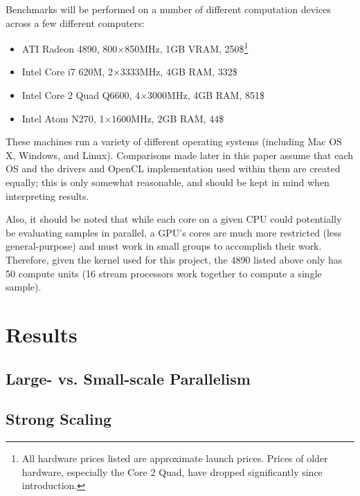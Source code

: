 \documentclass{acmsiggraph}
\begin{document}
Benchmarks will be performed on a number of different computation devices across a few different computers:

\begin{itemize}

\item ATI Radeon 4890, 800$\times$850MHz, 1GB VRAM, 250\$\footnote{All hardware prices listed are approximate launch prices. Prices of older hardware, especially the Core 2 Quad, have dropped significantly since introduction.\label{fn:prices}}

\item Intel Core i7 620M, 2$\times$3333MHz, 4GB RAM, 332\$

\item Intel Core 2 Quad Q6600, 4$\times$3000MHz, 4GB RAM, 851\$

\item Intel Atom N270, 1$\times$1600MHz, 2GB RAM, 44\$

\end{itemize}

These machines run a variety of different operating systems (including Mac OS X, Windows, and Linux). Comparisons made later in this paper assume that each OS and the drivers and OpenCL implementation used within them are created equally; this is only somewhat reasonable, and should be kept in mind when interpreting results.

Also, it should be noted that while each core on a given CPU could potentially be evaluating samples in parallel, a GPU's cores are much more restricted (less general-purpose) and must work in small groups to accomplish their work. Therefore, given the kernel used for this project, the 4890 listed above only has 50 compute units (16 stream processors work together to compute a single sample).

\section{Results}

\subsection{Large- vs. Small-scale Parallelism}

\subsection{Strong Scaling}
\end{document}
